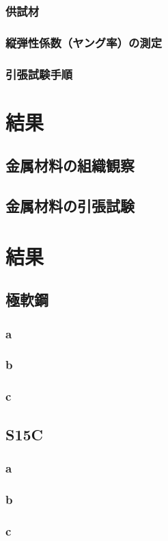 \documentclass[10pt,a4j]{jsarticle}
\begin{document}
  \subsubsection{供試材}
  \subsubsection{縦弾性係数（ヤング率）の測定}
  \subsubsection{引張試験手順}
\section{結果}
  \subsection{金属材料の組織観察}
  \subsection{金属材料の引張試験}
\section{結果}
  \subsection{極軟鋼}
    \subsubsection{a}
    \subsubsection{b}
    \subsubsection{c}
  \subsection{S15C}
      \subsubsection{a}
    \subsubsection{b}
    \subsubsection{c}
\end{document}
